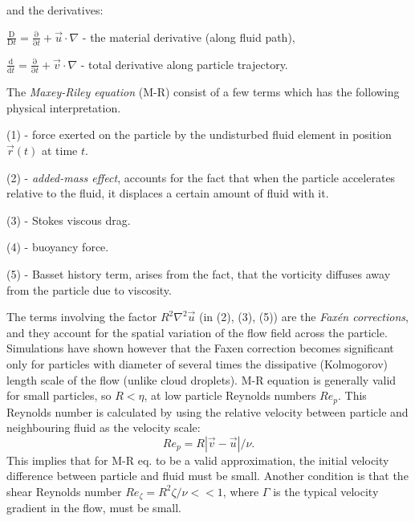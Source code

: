 \documentclass[../main.tex]{subfiles}
\begin{document}
and the derivatives:
\begin{description}
\item $\frac{\mathrm{D}}{\mathrm{D}t}=\frac{\mathrm{\partial}}{\mathrm{\partial}t}+\vec{u} \cdot \nabla$ - the material derivative (along fluid path), 
\item $\frac{\mathrm{d}}{\mathrm{d}t}=\frac{\mathrm{\partial}}{\mathrm{\partial}t}+\vec{v} \cdot \nabla$ - total derivative along particle trajectory.
\end{description}

The \emph{Maxey-Riley equation} (M-R) consist of a few terms which has the following physical interpretation.
\begin{description}
\item (1) - force exerted on the particle by the undisturbed fluid element in position $\vec{r}(t)$ at time $t$.
\item (2) - \emph{added-mass effect}, accounts for the fact that when the particle accelerates relative to the fluid, it displaces a certain amount of fluid with it.
\item (3) - Stokes viscous drag.
\item (4) - buoyancy force.
\item (5) - Basset history term, arises from the fact, that the vorticity diffuses away from the particle due to viscosity.
\end{description}
The terms involving the factor $R^2 \nabla^2 \vec{u}$ (in (2), (3), (5)) are the \emph{Faxén corrections}, and they account for the spatial variation of the flow field across the particle. Simulations have shown  however \citep{Calzavarini2012} that the Faxen correction becomes significant only for particles with diameter of several times the dissipative (Kolmogorov) length scale of the flow (unlike cloud droplets). M-R equation is generally valid for small particles, so $R<\eta$, at low particle Reynolds numbers $Re_p$. This Reynolds number is calculated by using the relative velocity between particle and neighbouring fluid as the velocity scale: 
\begin{equation}
Re_p = R|\vec{v} - \vec{u}|/\nu.
\label{def:Rep}
\end{equation}
This implies that for M-R eq. to be a valid approximation, the initial velocity difference between particle and fluid must be small. Another condition is that the shear Reynolds number $Re_{\zeta} = R^2 \zeta/\nu<<1$, where $\Gamma$ is the typical velocity gradient in the flow, must be small.\\
\end{document}
